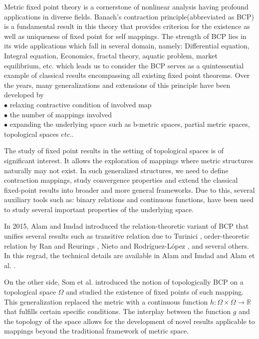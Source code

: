 \documentclass[10pt, reqno]{amsart}
\theoremstyle{definition}
\theoremstyle{remark}
\numberwithin{equation}{section}
\begin{document}
Metric fixed point theory is a cornerstone of nonlinear analysis having profound applications in diverse fields. Banach's contraction principle(abbreviated as BCP) \cite{banach1922operations} is a fundamental result in this theory that provides criterion for the existence as well as uniqueness of fixed point for self mappings. The strength of BCP lies in its wide applications which fall in several domain, namely: Differential equation, Integral equation, Economics, fractal theory, aquatic problem, market equilibrium, etc. which leads us to consider the BCP serves as a quintessential example of classical results encompassing all existing fixed point theorems.
Over the years, many generalizations and extensions of this principle have been developed by \\ 
 $\bullet$ relaxing contractive condition of involved map \\
$\bullet$ the number of mappings involved \\
$\bullet$ expanding the underlying space such as b-metric spaces, partial metric spaces, topological spaces $etc.$.  
%

The study of fixed point results in the setting of topological spaces is of significant interest. It allows the exploration of mappings where metric structures naturally may not exist. In such generalized structures, we need to define contraction mappings, study convergence properties and extend the classical fixed-point results into broader and more general frameworks. Due to this, several auxiliary tools such as: binary relations and continuous functions, have been used to study several important properties of the underlying space. 

%
In 2015, Alam and Imdad \cite{alam2015relation} introduced the relation-theoretic variant of BCP that unifies several results such as transitive relation due to Turinici \cite{turinici1986fixed}, order-theoretic relation by Ran and Reurings \cite{ran2004fixed}, Nieto and Rodr{\'i}guez-L{\'o}pez \cite{Nieto}, and several others. In this regrad, the technical details are available in Alam and Imdad \cite{alam2015relation} and Alam et al. \cite{alam2022relation}. 

On the other side, Som et al. \cite{S.Som} introduced the notion of topologically BCP  on a    topological space $ \Omega $   and studied the existence of fixed points of such mapping.   This generalization replaced the metric with a continuous function $  h : \Omega \times \Omega \to \mathbb{R} $ that fulfills certain specific conditions.     The interplay between the function $ g $  and the topology of the space allows for the development of novel results applicable to mappings beyond the traditional  framework of metric space. 
\end{document}

